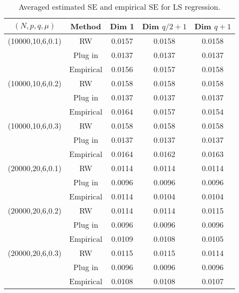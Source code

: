 \documentclass[12pt]{article}
\begin{document}
\begin{table}[!h]
	\centering
	\caption{Averaged estimated SE and empirical SE for LS regression.}
	\medskip
	\label{tab:sim1-1}
	\begin{tabular}{ccccc}
		\hline
		$(N, p, q, \mu)$ & Method &Dim 1& Dim $q/2+1$ & Dim $q+1$ \\
		\hline\hline
		(10000,10,6,0.1) & RW & 0.0157& 0.0158 & 0.0158 \\
		&Plug in & 0.0137& 0.0137& 0.0137\\
		&Empirical& 0.0156&  0.0157& 0.0158\\
		\hline
		(10000,10,6,0.2) &  RW & 0.0158&0.0158 & 0.0158 \\
		&Plug in & 0.0137& 0.0137& 0.0137\\
		&Empirical& 0.0164&  0.0157& 0.0154 \\
		\hline
		(10000,10,6,0.3) & RW & 0.0158&0.0158 & 0.0158 \\
		&Plug in & 0.0137& 0.0137& 0.0137\\
		&Empirical& 0.0164&  0.0162& 0.0163 \\
		\hline
		(20000,20,6,0.1) & RW & 0.0114&  0.0114& 0.0114 \\
		&Plug in & 0.0096& 0.0096&  0.0096\\
		&Empirical&  0.0114&   0.0104&0.0104  \\
		\hline
		(20000,20,6,0.2)& RW  & 0.0114&  0.0114& 0.0115 \\
		&Plug in & 0.0096& 0.0096&  0.0096\\
		&Empirical& 0.0109&  0.0108& 0.0105 \\
		\hline
		(20000,20,6,0.3) & RW & 0.0115&  0.0115& 0.0114 \\
		&Plug in & 0.0096& 0.0096&  0.0096\\
		&Empirical& 0.0108&  0.0108& 0.0107 \\
		\hline
	\end{tabular}
\end{table}
\end{document}
